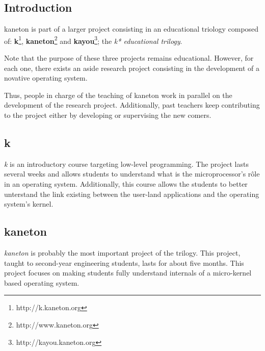 \begin{multicols}{2}

\tableofcontents

%
%

\section{Introduction}

kaneton is part of a larger project consisting in an educational
triology composed of:
  \textbf{k}\footnote{http://k.kaneton.org},
  \textbf{kaneton}\footnote{http://www.kaneton.org} and
  \textbf{kayou}\footnote{http://kayou.kaneton.org}; the
\textit{k* educational trilogy}.

Note that the purpose of these three projects remains educational. However,
for each one, there exists an aside research project consisting in the
development of a novative operating system.

Thus, people in charge of the teaching of kaneton work in parallel on the
development of the research project. Additionally, past teachers keep
contributing to the project either by developing or supervising the
new comers.

%
%

\subsection{k}

\textit{k} is an introductory course targeting low-level programming. The
project lasts several weeks and allows students to understand what is the
microprocessor's r\^ole in an operating system. Additionally, this course
allows the students to better unterstand the link existing between the
user-land applications and the operating system's kernel.

%
%

\subsection{kaneton}

\textit{kaneton} is probably the most important project of the trilogy. This
project, taught to second-year engineering students, lasts for about five
months. This project focuses on making students fully understand
internals of a micro-kernel based operating system.

%
%


\end{multicols}
